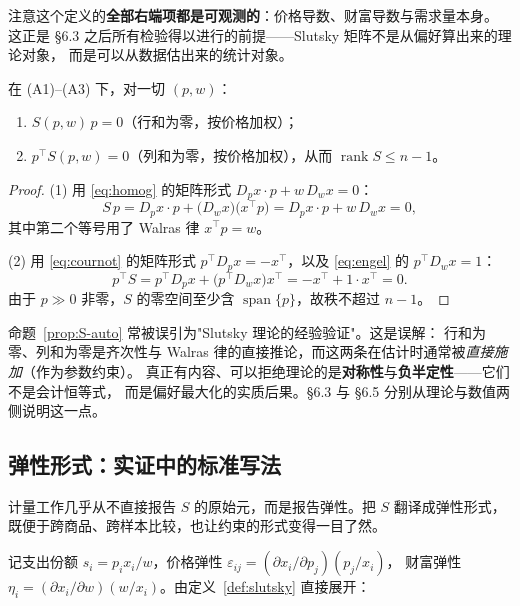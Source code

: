 注意这个定义的\textbf{全部右端项都是可观测的}：价格导数、财富导数与需求量本身。
这正是 \S 6.3 之后所有检验得以进行的前提——Slutsky 矩阵不是从偏好算出来的理论对象，
而是可以从数据估出来的统计对象。

\begin{proposition}[两条自动成立的性质]\label{prop:S-auto}
在 (A1)--(A3) 下，对一切 $(p,w)$：
\begin{enumerate}
\item $S(p,w)\,p=0$（行和为零，按价格加权）；
\item $p^{\top}S(p,w)=0$（列和为零，按价格加权），从而 $\operatorname{rank}S\le n-1$。
\end{enumerate}
\end{proposition}

\begin{proof}
(1) 用 \eqref{eq:homog} 的矩阵形式 $D_px\cdot p+w\,D_wx=0$：
\[
 S\,p=D_px\cdot p+\bigl(D_wx\bigr)\bigl(x^{\top}p\bigr)
 =D_px\cdot p+w\,D_wx=0,
\]
其中第二个等号用了 Walras 律 $x^{\top}p=w$。

(2) 用 \eqref{eq:cournot} 的矩阵形式 $p^{\top}D_px=-x^{\top}$，以及 \eqref{eq:engel} 的 $p^{\top}D_wx=1$：
\[
 p^{\top}S=p^{\top}D_px+\bigl(p^{\top}D_wx\bigr)x^{\top}
 =-x^{\top}+1\cdot x^{\top}=0.
\]
由于 $p\gg0$ 非零，$S$ 的零空间至少含 $\operatorname{span}\{p\}$，故秩不超过 $n-1$。
\end{proof}

\begin{remark}[不要把自动性质当成检验]
命题~\ref{prop:S-auto} 常被误引为"Slutsky 理论的经验验证"。这是误解：
行和为零、列和为零是齐次性与 Walras 律的直接推论，而这两条在估计时通常被\emph{直接施加}（作为参数约束）。
真正有内容、可以拒绝理论的是\textbf{对称性}与\textbf{负半定性}——它们不是会计恒等式，
而是偏好最大化的实质后果。\S 6.3 与 \S 6.5 分别从理论与数值两侧说明这一点。
\end{remark}

\subsection{弹性形式：实证中的标准写法}

计量工作几乎从不直接报告 $S$ 的原始元，而是报告弹性。把 $S$ 翻译成弹性形式，
既便于跨商品、跨样本比较，也让约束的形式变得一目了然。

记支出份额 $s_i=p_ix_i/w$，价格弹性 $\varepsilon_{ij}=(\partial x_i/\partial p_j)(p_j/x_i)$，
财富弹性 $\eta_i=(\partial x_i/\partial w)(w/x_i)$。由定义~\ref{def:slutsky} 直接展开：

